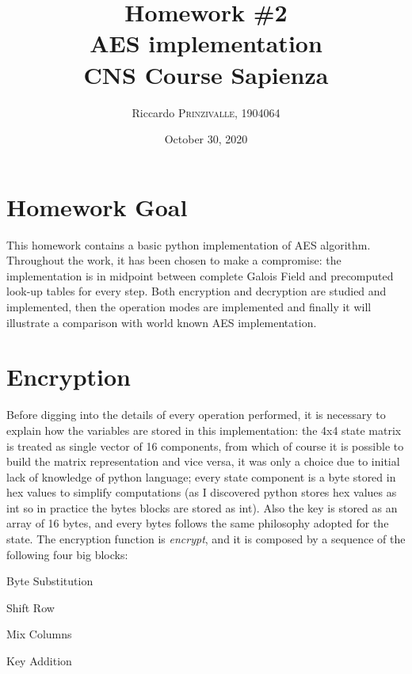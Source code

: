 \documentclass{article}
\title{Homework \#2 \\AES implementation \\[0.2em]\small{}CNS Course Sapienza} %
\author{Riccardo \textsc{Prinzivalle}, 1904064} %
\date{October 30, 2020} %
\begin{document}
\maketitle %


\section{Homework Goal}

This homework contains a basic python implementation of AES algorithm. Throughout the work, it has been chosen to make a compromise: the implementation is in midpoint between complete Galois Field and precomputed look-up tables for every step. Both encryption and decryption are studied and implemented, then the operation modes are implemented and finally it will illustrate a comparison with world known AES implementation.

\section{Encryption}
Before digging into the details of every operation performed, it is necessary to explain how the variables are stored in this implementation: the 4x4 state matrix is treated as single vector of 16 components, from which of course it is possible to build the matrix representation and vice versa, it was only a choice due to initial lack of knowledge of python language; every state component is a byte stored in hex values to simplify computations (as I discovered python stores hex values as int so in practice the bytes blocks are stored as int). Also the key is stored as an array of 16 bytes, and every bytes follows the same philosophy adopted for the state. \newline
The encryption function is \textit{encrypt}, and it is composed by a sequence of the following four big blocks:  

\begin{enumerate}
\begin{item}
Byte Substitution
\end{item}
\begin{item}
Shift Row 
\end{item}
\begin{item}
Mix Columns
\end{item}
\begin{item}
Key Addition 
\end{item}
\end{enumerate}
\end{document}
